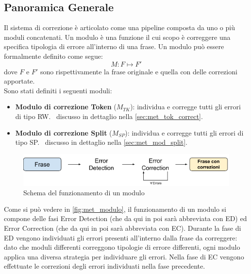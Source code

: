 \subsection{Panoramica Generale}
\label{sec:met_panoramica}
Il sistema di correzione è articolato come una pipeline composta da uno o più moduli 	concatenati. Un modulo è una funzione il cui scopo è correggere una specifica tipologia di errore all'interno di una frase. Un modulo può essere formalmente definito come segue:
\begin{equation}
M: F \mapsto F\prime
\end{equation}
dove $F$ e $F\prime$ sono rispettivamente la frase originale e quella con delle correzioni apportate. \\
Sono stati definiti i seguenti moduli:
\begin{itemize}
\item \textbf{Modulo di correzione Token} ($M_{TK}$): individua e corregge tutti gli errori di tipo RW. \E\ discusso in dettaglio nella \autoref{sec:met_tok_correct}.
\item \textbf{Modulo di correzione Split} ($M_{SP}$): individua e corregge tutti gli errori di tipo SP. \E\ discusso in dettaglio nella \autoref{sec:met_mod_split}.
\end{itemize}

\begin{figure}[H]
\centering
\includegraphics[width=\textwidth]{immagini/metodologia/modulo}
\caption{Schema del funzionamento di un modulo}
\label{fig:met_modulo}
\end{figure}

Come si può vedere in \autoref{fig:met_modulo}, il funzionamento di un modulo si compone delle fasi Error Detection (che da qui in poi sarà abbreviata con ED) ed Error Correction (che da qui in poi sarà abbreviata con EC). Durante la fase di ED vengono individuati gli errori presenti all'interno dalla frase da correggere: dato che moduli differenti correggono tipologie di errore differenti, ogni modulo applica una diversa strategia per individuare gli errori. Nella fase di EC vengono effettuate le correzioni degli errori individuati nella fase precedente.

